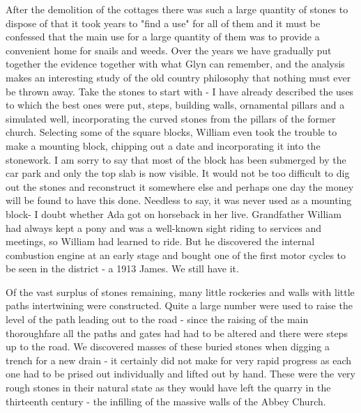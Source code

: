 After the demolition of the cottages there was such a large quantity of stones to dispose of that it took years to "find a use" for all of them and it must be confessed that the main use for a large quantity of them was to provide a convenient home for snails and weeds. Over the years we have gradually put together the evidence together with what Glyn can remember, and the analysis makes an interesting study of the old country philosophy that nothing must ever be thrown away. Take the stones to start with - I have already described the uses to which the best ones were put, steps, building walls, ornamental pillars and a simulated well, incorporating the curved stones from the pillars of the former church. Selecting some of the square blocks, William even took the trouble to make a mounting block, chipping out a date and incorporating it into the stonework. I am sorry to say that most of the block has been submerged by the car park and only the top slab is now visible. It would not be too difficult to dig out the stones and reconstruct it somewhere else and perhaps one day the money will be found to have this done. Needless to say, it was never used as a mounting block- I doubt whether Ada got on horseback in her live. Grandfather William had always kept a pony and was a well-known sight riding to services and meetings, so William had learned to ride. But he discovered the internal combustion engine at an early stage and bought one of the first motor cycles to be seen in the district - a 1913 James. We still have it.

Of the vast surplus of stones remaining, many little rockeries and walls with little paths intertwining were constructed. Quite a large number were used to raise the level of the path leading out to the road - since the raising of the main thoroughfare all the paths and gates had had to be altered and there were steps up to the road. We discovered masses of these buried stones when digging a trench for a new drain - it certainly did not make for very rapid progress as each one had to be prised out individually and lifted out by hand. These were the very rough stones in their natural state as they would have left the quarry in the thirteenth century - the infilling of the massive walls of the Abbey Church.

